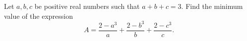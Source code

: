 Let $a,b,c$ be positive real numbers such that $a+b+c = 3$.  Find the minimum value of the expression \[A=\dfrac{2-a^3}a+\dfrac{2-b^3}b+\dfrac{2-c^3}c.\]